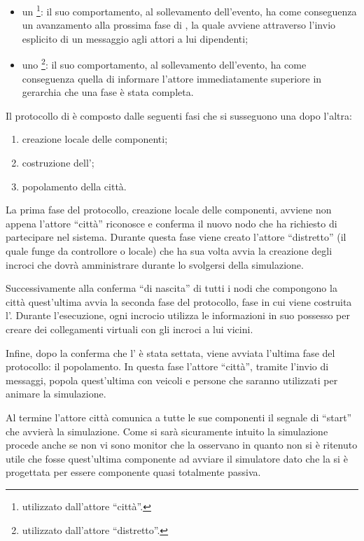 \begin{itemize}
\item{un \footnote{utilizzato dall'attore ``città''.}: il suo comportamento, al sollevamento dell'evento, ha come conseguenza un avanzamento alla prossima fase di , la quale avviene attraverso l'invio esplicito di un messaggio agli attori a lui dipendenti;}
\item{uno \footnote{utilizzato dall'attore ``distretto''.}: il suo comportamento, al sollevamento dell'evento, ha come conseguenza quella di informare l'attore immediatamente superiore in gerarchia che una fase è stata completa.}
\end{itemize}

Il protocollo di  è composto dalle seguenti fasi che si susseguono una dopo l'altra:

\begin{enumerate}
\item{creazione locale delle componenti;}
\item{costruzione dell';}
\item{popolamento della città.}
\end{enumerate}

La prima fase del protocollo, creazione locale delle componenti, avviene non appena l'attore ``città'' riconosce e conferma il nuovo nodo che ha richiesto di partecipare nel sistema. Durante questa fase viene creato l'attore ``distretto'' (il quale funge da controllore o  locale) che ha sua volta avvia la creazione degli incroci che dovrà amministrare durante lo svolgersi della simulazione.

Successivamente alla conferma ``di nascita'' di tutti i nodi che compongono la città quest'ultima avvia la seconda fase del protocollo, fase in cui viene costruita l'. Durante l'esecuzione, ogni incrocio utilizza le informazioni in suo possesso per creare dei collegamenti virtuali con gli incroci a lui vicini.

Infine, dopo la conferma che l' è stata settata, viene avviata l'ultima fase del protocollo: il popolamento. In questa fase l'attore ``città'', tramite l'invio di messaggi, popola quest'ultima con veicoli e persone che saranno utilizzati per animare la simulazione.

Al termine l'attore città comunica a tutte le sue componenti il segnale di ``start'' che avvierà la simulazione. Come si sarà sicuramente intuito la simulazione procede anche se non vi sono monitor che la osservano in quanto non si è ritenuto utile che fosse quest'ultima componente ad avviare il simulatore dato che la si è progettata per essere componente quasi totalmente passiva.

